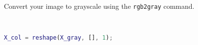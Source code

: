 Convert your image to grayscale using the \texttt{rgb2gray} command.

\begin{solution}\ 
    \begin{lstlisting}[language=Matlab]
    X_col = reshape(X_gray, [], 1);
    \end{lstlisting}
\end{solution}